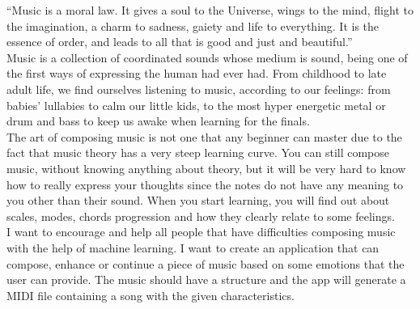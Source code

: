 “Music is a moral law. It gives a soul to the Universe, wings to the mind, flight to the imagination, a charm to sadness, gaiety and life to everything.
It is the essence of order, and leads to all that is good and just and beautiful.” \cite{quotationDictionary}\\
\vspace{0.5cm}
Music is a collection of coordinated sounds \cite{whatIsMusic} whose medium is sound,
being one of the first ways of expressing the human had ever had.
From childhood to late adult life, we find ourselves listening to music, according to our feelings:
from babies’ lullabies to calm our little kids, to the most hyper energetic metal or drum and bass to keep us awake when learning for the finals.\\
\vspace{0.5cm}
The art of composing music is not one that any beginner can master due to the fact that
music theory has a very steep learning curve.
You can still compose music, without knowing anything about theory,
but it will be very hard to know how to really express your thoughts since the notes do not have any meaning to you other than their sound.
When you start learning, you will find out about scales, modes, chords progression and how they clearly relate to some feelings.\\
\vspace{0.5cm}
I want to encourage and help all people that have difficulties composing music with the help of machine learning.
I want to create an application that can compose, enhance or continue a piece of music based on some emotions that the user can provide.
The music should have a structure and the app will generate a MIDI file containing a song with the given characteristics.
